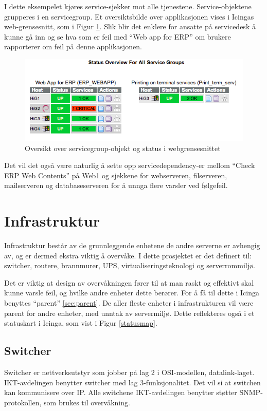 I dette eksempelet kjøres service-sjekker mot alle tjenestene. Service-objektene grupperes i en servicegroup. Et oversiktsbilde over applikasjonen vises i Icingas web-grensesnitt, som i Figur \ref{servicegroup_web}. Slik blir det enklere for ansatte på servicedesk å kunne gå inn og se hva som er feil med ``Web app for ERP'' om brukere rapporterer om feil på denne applikasjonen.

\begin{figure}[H]
    \centering
    \includegraphics[scale=0.6]{img/servicegroup_web}
    \caption{ Oversikt over servicegroup-objekt og status i webgrensesnittet}
    \label{servicegroup_web}
\end{figure}
Det vil det også være naturlig å sette opp servicedependency-er mellom ``Check ERP Web Contents'' på Web1 og sjekkene for webserveren, filserveren, mailserveren og databaseserveren for å unnga flere varsler ved følgefeil.

\section{Infrastruktur}
Infrastruktur består av de grunnleggende enhetene de andre serverne er avhengig av, og er dermed ekstra viktig å overvåke. I dette prosjektet er det definert til: switcher, routere, brannmurer, UPS, virtualiseringsteknologi og serverrommiljø.

Det er viktig at design av overvåkningen fører til at man raskt og effektivt skal kunne varsle feil, og hvilke andre enheter dette berører. For å få til dette i Icinga benyttes ``parent'' \ref{sec:parent}. De aller fleste enheter i infrastrukturen vil være parent for andre enheter, med unntak av servermiljø. Dette reflekteres også i et statuskart i Icinga, som vist i Figur \ref{statusmap}.

\subsection{Switcher}\label{sec:switch}
Switcher er nettverksutstyr som jobber på lag 2 i OSI-modellen, datalink-laget. IKT-avdelingen benytter switcher med lag 3-funksjonalitet. Det vil si at switchen kan kommunisere over IP. Alle switchene IKT-avdelingen benytter støtter SNMP-protokollen, som brukes til overvåkning.

